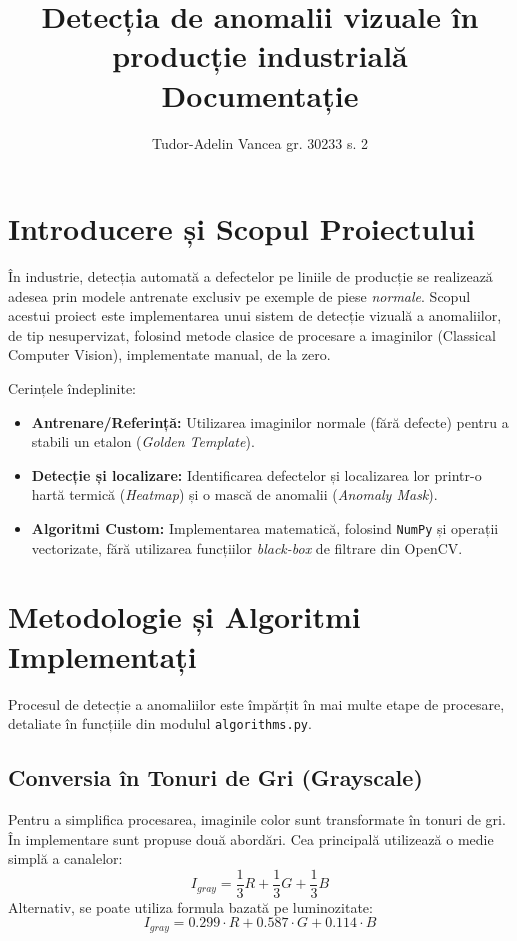 \documentclass[12pt, a4paper]{article}
\title{\textbf{Detecția de anomalii vizuale în producție industrială} \\ \large Documentație}
\author{Tudor-Adelin Vancea gr. 30233 s. 2}
\date{}
\begin{document}
\maketitle

\section{Introducere și Scopul Proiectului}
În industrie, detecția automată a defectelor pe liniile de producție se realizează adesea prin modele antrenate exclusiv pe exemple de piese \textit{normale}. Scopul acestui proiect este implementarea unui sistem de detecție vizuală a anomaliilor, de tip nesupervizat, folosind metode clasice de procesare a imaginilor (Classical Computer Vision), implementate manual, de la zero.

Cerințele îndeplinite:
\begin{itemize}
    \item \textbf{Antrenare/Referință:} Utilizarea imaginilor normale (fără defecte) pentru a stabili un etalon (\textit{Golden Template}).
    \item \textbf{Detecție și localizare:} Identificarea defectelor și localizarea lor printr-o hartă termică (\textit{Heatmap}) și o mască de anomalii (\textit{Anomaly Mask}).
    \item \textbf{Algoritmi Custom:} Implementarea matematică, folosind \texttt{NumPy} și operații vectorizate, fără utilizarea funcțiilor \textit{black-box} de filtrare din OpenCV.
\end{itemize}

\section{Metodologie și Algoritmi Implementați}
Procesul de detecție a anomaliilor este împărțit în mai multe etape de procesare, detaliate în funcțiile din modulul \texttt{algorithms.py}.

\subsection{Conversia în Tonuri de Gri (Grayscale)}
Pentru a simplifica procesarea, imaginile color sunt transformate în tonuri de gri. În implementare sunt propuse două abordări. Cea principală utilizează o medie simplă a canalelor:
\begin{equation}
    I_{gray} = \frac{1}{3}R + \frac{1}{3}G + \frac{1}{3}B
\end{equation}
Alternativ, se poate utiliza formula bazată pe luminozitate:
\begin{equation}
    I_{gray} = 0.299 \cdot R + 0.587 \cdot G + 0.114 \cdot B
\end{equation}
\end{document}
